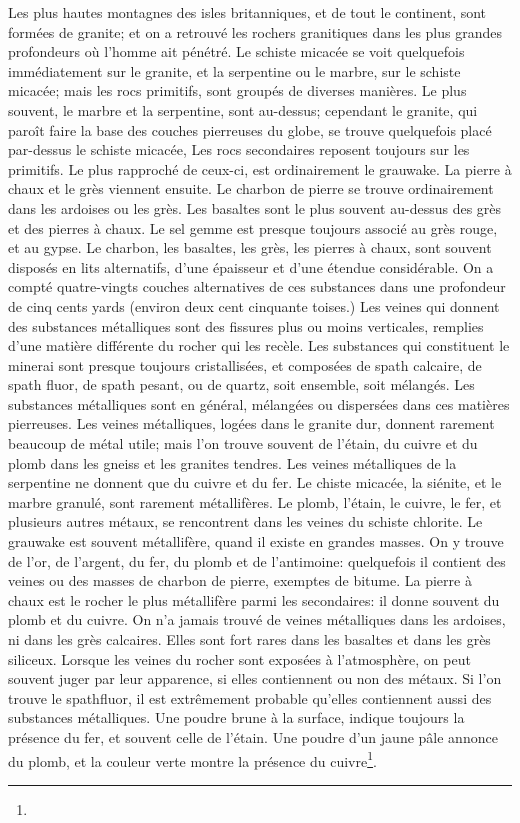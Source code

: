 Les plus hautes montagnes des isles britanniques, et de tout le continent, sont formées de granite; et on a retrouvé les rochers granitiques dans les plus grandes profondeurs où l'homme ait pénétré. Le schiste micacée se voit quelquefois immédiatement sur le granite, et la serpentine ou le marbre, sur le schiste micacée; mais les rocs primitifs, sont groupés de diverses manières. Le plus souvent, le marbre et la serpentine, sont au-dessus; cependant le granite, qui paroît faire la base des couches pierreuses du globe, se trouve quelquefois placé par-dessus le schiste micacée,\setcounter{page}{476} Les rocs secondaires reposent toujours sur les primitifs. Le plus rapproché de ceux-ci, est ordinairement le grauwake. La pierre à chaux et le grès viennent ensuite. Le charbon de pierre se trouve ordinairement dans les ardoises ou les grès. Les basaltes sont le plus souvent au-dessus des grès et des pierres à chaux. Le sel gemme est presque toujours associé au grès rouge, et au gypse. Le charbon, les basaltes, les grès, les pierres à chaux, sont souvent disposés en lits alternatifs, d'une épaisseur et d'une étendue considérable. On a compté quatre-vingts couches alternatives de ces substances dans une profondeur de cinq cents yards (environ deux cent cinquante toises.) Les veines qui donnent des substances métalliques sont des fissures plus ou moins verticales, remplies d'une matière différente du rocher qui les recèle. Les substances qui constituent le minerai sont presque toujours cristallisées, et composées de spath calcaire, de spath fluor, de spath pesant, ou de quartz, soit ensemble, soit mélangés. Les substances métalliques sont en général, mélangées ou dispersées dans ces matières pierreuses. Les veines métalliques, logées dans le granite dur, donnent rarement beaucoup de métal utile;\setcounter{page}{477} mais l'on trouve souvent de l'étain, du cuivre et du plomb dans les gneiss et les granites tendres. Les veines métalliques de la serpentine ne donnent que du cuivre et du fer. Le chiste micacée, la siénite, et le marbre granulé, sont rarement métallifères. Le plomb, l'étain, le cuivre, le fer, et plusieurs autres métaux, se rencontrent dans les veines du schiste chlorite. Le grauwake est souvent métallifère, quand il existe en grandes masses. On y trouve de l'or, de l'argent, du fer, du plomb et de l'antimoine: quelquefois il contient des veines ou des masses de charbon de pierre, exemptes de bitume. La pierre à chaux est le rocher le plus métallifère parmi les secondaires: il donne souvent du plomb et du cuivre. On n'a jamais trouvé de veines métalliques dans les ardoises, ni dans les grès calcaires. Elles sont fort rares dans les basaltes et dans les grès siliceux. Lorsque les veines du rocher sont exposées à l'atmosphère, on peut souvent juger par leur apparence, si elles contiennent ou non des métaux. Si l'on trouve le spathfluor, il est extrêmement probable qu'elles contiennent aussi des substances métalliques. Une poudre brune à la surface, indique toujours la présence du fer, et souvent celle de l'étain.\setcounter{page}{478} Une poudre d'un jaune pâle annonce du plomb, et la couleur verte montre la présence du cuivre\footnote{}.
